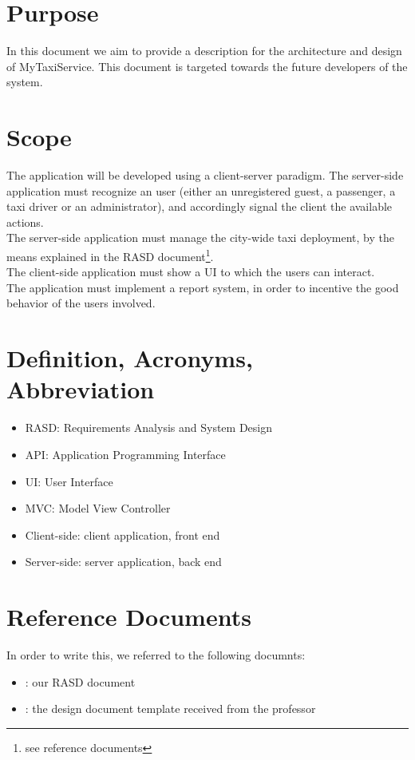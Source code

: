 \section{Purpose}
In this document we aim to provide a description for the architecture and design of MyTaxiService.
This document is targeted towards the future developers of the system.

\section{Scope}
The application will be developed using a client-server paradigm.
The server-side application must recognize an user (either an unregistered guest, a passenger, a taxi driver or an administrator), 
and accordingly signal the client the available actions. \\
The server-side application must manage the city-wide taxi deployment, by the means explained in the RASD 
document\footnote{see reference documents}. \\ The client-side application must show a UI to which the users can interact. \\
The application must implement a report system, in order to incentive the good behavior of the users involved.

\section{Definition, Acronyms, Abbreviation}
\begin{itemize}
 \item RASD: Requirements Analysis and System Design
 \item API: Application Programming Interface
 \item UI: User Interface
 \item MVC: Model View Controller
 \item Client-side: client application, front end
 \item Server-side: server application, back end
\end{itemize}

\section{Reference Documents}
In order to write this, we referred to the following documnts:
\begin{itemize}
 \item [1]: our RASD document
 \item [2]: the design document template received from the professor
\end{itemize}

